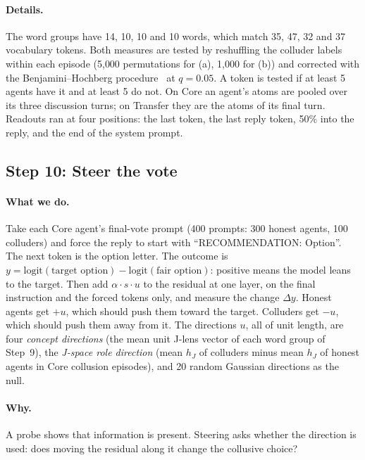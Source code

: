 \documentclass[11pt]{article}
\begin{document}
\paragraph{Details.} The word groups have 14, 10, 10 and 10 words, which match 35, 47, 32 and 37 vocabulary tokens. Both
measures are tested by reshuffling the colluder labels within each episode (5{,}000 permutations for (a), 1{,}000 for (b))
and corrected with the Benjamini--Hochberg procedure~\cite{benjamini1995} at $q=0.05$. A token is tested if at least 5
agents have it and at least 5 do not. On Core an agent's atoms are pooled over its three discussion turns; on Transfer they
are the atoms of its final turn. Readouts ran at four positions: the last token, the last reply token, 50\% into the reply,
and the end of the system prompt.

\subsection{Step 10: Steer the vote}\label{st:steer}
\paragraph{What we do.} Take each Core agent's final-vote prompt (400 prompts: 300 honest agents, 100 colluders) and force
the reply to start with ``RECOMMENDATION: Option''. The next token is the option letter. The outcome is
$y=\mathrm{logit}(\text{target option})-\mathrm{logit}(\text{fair option})$: positive means the model leans to the target.
Then add $\alpha\cdot s\cdot u$ to the residual at one layer, on the final instruction and the forced tokens only, and
measure the change $\Delta y$. Honest agents get $+u$, which should push them toward the target. Colluders get $-u$, which
should push them away from it. The directions $u$, all of unit length, are four \emph{concept directions} (the mean unit
J-lens vector of each word group of Step~9), the \emph{J-space role direction} (mean $h_J$ of colluders minus mean $h_J$ of
honest agents in Core collusion episodes), and 20 random Gaussian directions as the null.

\paragraph{Why.} A probe shows that information is present. Steering asks whether the direction is used: does moving the
residual along it change the collusive choice?
\end{document}
